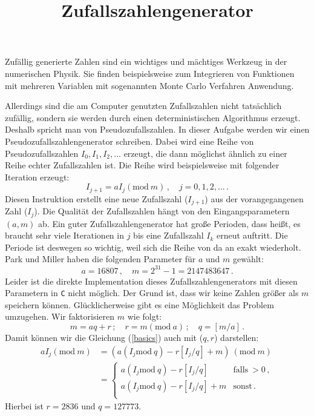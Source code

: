 \documentclass{article}[12pt]
\title{Zufallszahlengenerator}
\begin{document}
\maketitle
\noindent Zufällig generierte Zahlen sind ein wichtiges und mächtiges Werkzeug in der numerischen Physik. 
Sie finden beispielsweise zum Integrieren von Funktionen mit mehreren Variablen mit sogenannten Monte Carlo Verfahren Anwendung.

Allerdings sind die am Computer genutzten Zufallszahlen nicht tatsächlich zufällig, sondern sie werden durch einen deterministischen Algorithmus erzeugt. 
Deshalb spricht man von Pseudozufallszahlen.
In dieser Aufgabe werden wir einen Pseudozufallszahlengenerator schreiben. 
Dabei wird eine Reihe von Pseudozufallszahlen $I_0, I_1, I_2, \ldots$ erzeugt, die dann möglichst ähnlich zu einer Reihe echter Zufallszahlen ist.
Die Reihe wird beispielsweise mit folgender Iteration erzeugt:
\begin{equation}
  I_{j+1}=a I_{j} \left( \mathrm{mod}\ m\right)\,,\quad j=0,1,2,\ldots\,.
  \label{basics}
\end{equation}
Diesen Instruktion erstellt eine neue Zufallszahl ($I_{j+1}$) aus der vorangegangenen Zahl ($I_j$). Die Qualität der Zufallszahlen 
hängt von den Eingangsparametern $(a,m)$ ab. 
Ein guter Zufallszahlengenerator hat große Perioden, dass hei\ss{}t, es braucht sehr viele Iterationen in $j$ bis eine Zufallszahl $I_k$ erneut auftritt.
Die Periode ist deswegen so wichtig, weil sich die Reihe von da an exakt wiederholt.
Park und Miller haben die folgenden Parameter für $a$ und $m$ gewählt:
\begin{equation}
  a=16807\,,\quad m=2^{31}-1=2147483647\,. 
\end{equation}
Leider ist die direkte Implementation dieses Zufallszahlengenerators mit diesen Parametern in \texttt{C} nicht möglich. 
Der Grund ist, dass wir keine Zahlen größer als $m$ speichern können. 
Glücklicherweise gibt es eine Möglichkeit das Problem umzugehen. 
Wir faktorisieren $m$ wie folgt:
\begin{equation}
  m = aq + r\,;\quad r= m \left(\mathrm{mod}\ a\right)\,;\quad q= \left[m/a\right]\,.
\end{equation}
Damit können wir die Gleichung (\ref{basics}) auch mit ($q,r$) darstellen:
\begin{equation}
  \begin{split}
    a I_j \left( \mathrm{mod}\ m\right)&=  
    (a\left(I_j \mathrm{mod}\ q\right) -r \left[I_j/q\right] + m)\ (\mathrm{mod}\ m)\\
    &=  \begin{cases}
      a\left(I_j \mathrm{mod}\ q\right) -r \left[I_j/q\right] & \mathrm{falls~}>0\,, \\ 
      a\left(I_j \mathrm{mod}\ q\right) -r \left[I_j/q\right] + m & \mathrm{sonst}\,. \\ 
    \end{cases}
  \end{split}
  \label{algo}
\end{equation}
Hierbei ist $r=2836$ und $q=127773$. 
\end{document}
